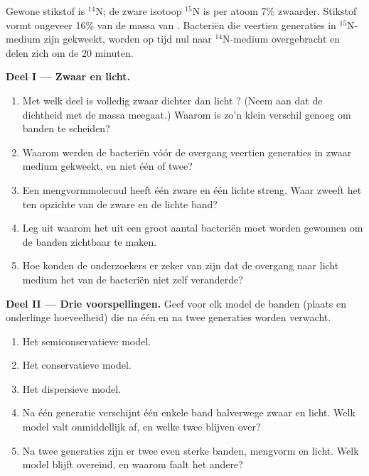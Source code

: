 \begin{problem}
\label{pb:g11:dna-replication:1}
Gewone stikstof is $^{14}$N; de zware isotoop $^{15}$N is per atoom 7\%
zwaarder. Stikstof vormt ongeveer 16\% van de massa van . Bacteriën
die veertien generaties in $^{15}$N-medium zijn gekweekt, worden op tijd
nul naar $^{14}$N-medium overgebracht en delen zich om de 20 minuten.

\medskip
\noindent\textbf{Deel I --- Zwaar en licht.}
\begin{enumerate}
  \item Met welk deel is volledig zwaar  dichter dan licht ? (Neem
        aan dat de dichtheid met de massa meegaat.) Waarom is zo'n klein
        verschil genoeg om banden te scheiden?
  \item Waarom werden de bacteriën vóór de overgang veertien generaties
        in zwaar medium gekweekt, en niet één of twee?
  \item Een mengvormmolecuul heeft één zware en één lichte streng. Waar
        zweeft het ten opzichte van de zware en de lichte band?
  \item Leg uit waarom het  uit een groot aantal bacteriën moet worden
        gewonnen om de banden zichtbaar te maken.
  \item Hoe konden de onderzoekers er zeker van zijn dat de overgang naar
        licht medium het  van de bacteriën niet zelf veranderde?
\end{enumerate}

\medskip
\noindent\textbf{Deel II --- Drie voorspellingen.}
Geef voor elk model de banden (plaats en onderlinge hoeveelheid) die na
één en na twee generaties worden verwacht.
\begin{enumerate}[resume]
  \item Het semiconservatieve model.
  \item Het conservatieve model.
  \item Het dispersieve model.
  \item Na één generatie verschijnt één enkele band halverwege zwaar en
        licht. Welk model valt onmiddellijk af, en welke twee blijven
        over?
  \item Na twee generaties zijn er twee even sterke banden, mengvorm en
        licht. Welk model blijft overeind, en waarom faalt het andere?
\end{enumerate}


\end{problem}

